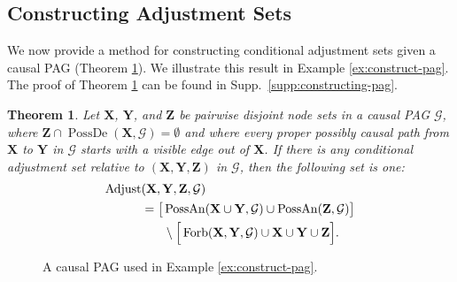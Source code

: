\documentclass[twoside]{article}
\newtheorem{theorem}{Theorem}
\DeclareMathOperator{\PossDe}{PossDe}
\DeclareMathOperator{\PossAn}{PossAn}
\DeclareMathOperator{\Forb}{Forb}
\newcommand{\fb}[2][X,Y]{\Forb(\mb{#1},#2)}
\DeclareMathOperator{\Adjust}{Adjust}
\newcommand{\mb}[1]{\mathbf{#1}}
\newcommand{\g}[1][G]{\mathcal{#1}}
\begin{document}

\subsection{Constructing Adjustment Sets}
\label{sec:constructing-pag}

We now provide a method for constructing conditional adjustment sets given a causal PAG (Theorem \ref{thm:adjust-and-o-pag}). We illustrate this result in Example \ref{ex:construct-pag}. The proof of Theorem \ref{thm:adjust-and-o-pag} can be found in Supp.\ \ref{supp:constructing-pag}.


\begin{theorem}
\label{thm:adjust-and-o-pag}  
    Let $\mb{X}$, $\mb{Y}$, and $\mb{Z}$ be pairwise disjoint node sets in a causal PAG $\g$, where $\mb{Z} \cap \PossDe(\mb{X}, \g) = \emptyset$ and where every proper possibly causal path from $\mb{X}$ to $\mb{Y}$ in $\g$ starts with a visible edge out of $\mb{X}$. If there is any conditional adjustment set relative to $(\mb{X,Y,Z})$ in $\g$, then the following set is one:
    \begin{align}\label{eq:adjust-pag}
        \Adjust&(\mb{X},\mb{Y},\mb{Z},\g) \\
            &= \big[ \PossAn(\mb{X \cup Y}, \g) \cup \PossAn(\mb{Z}, \g) \big] \nonumber\\
            & \hspace{.25in} \setminus \Big[ \fb{\g} \cup \mb{X} \cup \mb{Y} \cup \mb{Z} \Big]. \nonumber
    \end{align}
\end{theorem}

\begin{figure}
        \vspace{1cm}
        \centering
        \caption{A causal PAG used in Example \ref{ex:construct-pag}.}
    \label{fig:example-pag}
\end{figure}
\end{document}
